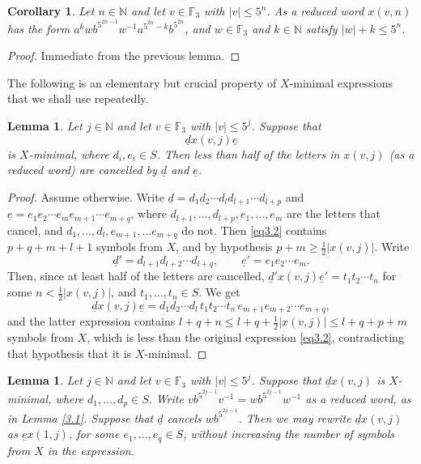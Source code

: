 \documentclass[twoside,11pt]{amsart}
\numberwithin{equation}{section}
\newtheorem{lemma}[theorem]{Lemma}
\newtheorem{corollary}[theorem]{Corollary}
\theoremstyle{definition}
\newcommand {\N}{\mathbb N}
\newcommand{\1}{\mathbbm{1}}
\newcommand{\F}{\mathbb F}
\newcommand{\pdt}{\underline}
\begin{document}
	\begin{corollary}		\label{3.1a}
		Let $n \in \N$ and let $v \in \F_3$ with $|v| \leq 5^n$. As a reduced word $x(v,n)$ has the form
		$a^k w b^{5^{2n-1}} w^{-1} a^{5^{2n}-k}b^{5^{2n}}$, and  $w \in \F_3$ and $k \in \N$ satisfy $|w|+k \leq 5^n$. 
	\end{corollary}
	
	\begin{proof}
		Immediate from the previous lemma.
	\end{proof}
	
	The following is an elementary but crucial property of $X$-minimal expressions that we shall use repeatedly.
	
	\begin{lemma}		\label{3.3}
		Let $j \in \N$ and let $v \in \F_3$ with $|v| \leq 5^j$. Suppose that 
		\begin{equation}	\label{eq3.2}
			\pdt{d} x(v,j) \pdt{e}
		\end{equation}
		is $X$-minimal, where $d_i, e_i \in S$. Then less than half of the letters in $x(v,j)$ (as a reduced word) are cancelled by $\pdt{d}$ and $\pdt{e}$.
	\end{lemma}
	
	\begin{proof}
		Assume otherwise. Write $\pdt{d} = d_1 d_2 \cdots d_ld_{l+1} \cdots d_{l+p}$ and 
		$\pdt{e} = e_1 e_2 \cdots e_m e_{m+1} \cdots e_{m+q}$, where $d_{l+1}, \ldots, d_{l+p}, e_1, \ldots, e_m$ are the letters that cancel, and $d_1, \ldots, d_l, e_{m+1}, \ldots e_{m+q}$ do not. Then \eqref{eq3.2} contains $p+q+m+l +1$ symbols from $X$, and by hypothesis $p+m \geq \frac{1}{2}|x(v,j)|$. Write
		$$\pdt{d}' = d_{l+1} d_{l+2} \cdots d_{l+q}, \qquad \pdt{e}' = e_1 e_2 \cdots e_m.$$
		Then, since at least half of the letters are cancelled, $\pdt{d}'x(v,j)\pdt{e}' = t_1t_2\cdots t_n$ for some $n < \frac{1}{2}|x(v,j)|$, and $t_1, \ldots, t_n \in S$. We get
		$$\pdt{d}x(v,j) \pdt{e} =  d_1d_2\cdots d_l \, t_1t_2 \cdots t_n \, e_{m+1} e_{m+2} \cdots e_{m+q},$$
		and the latter expression contains $l+q+n \leq l+q+ \frac{1}{2}|x(v,j)| \leq l+q +p + m$ symbols from $X$, which is less than the original expression \eqref{eq3.2}, contradicting that hypothesis that it is $X$-minimal.
	\end{proof}	
	
	\begin{lemma}		\label{3.2}
		Let $j \in \N$ and let $v \in \F_3$ with $|v| \leq 5^j$. Suppose that $\pdt{d} x(v, j)$ is $X$-minimal, where $d_1, \ldots, d_p \in S.$ Write 
		$vb^{5^{2j-1}}v^{-1} = w b^{5^{2j-1}} w^{-1}$ as a reduced word, as in Lemma \ref{3.1}. Suppose that $\pdt{d}$ cancels $wb^{5^{2j-1}}$. Then we may rewrite $\pdt{d}x(v,j)$ as $\pdt{e}x(1,j)$, for some 
		$e_1, \ldots, e_{q} \in S$, without increasing the number of symbols from $X$ in the expression.
	\end{lemma}
	
\end{document}
